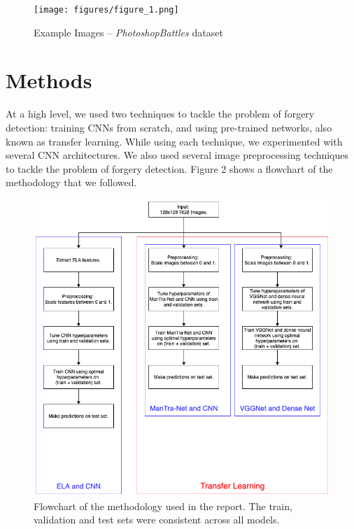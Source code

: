 \documentclass[11pt]{article}
\begin{document}
\begin{figure}[!htb]
    \centering
        \texttt{[image: figures/figure\_1.png]}
    \caption{Example Images -- {\it PhotoshopBattles} dataset}
    \label{fig:1}
\end{figure}

\section{Methods}

At a high level, we used two techniques to tackle the problem of forgery detection: training CNNs from scratch, and using pre-trained networks, also known as transfer learning. While using each technique, we experimented with several CNN architectures. We also used several image preprocessing techniques to tackle the problem of forgery detection. Figure 2 shows a flowchart of the methodology that we followed.

\begin{figure}[!htb]
    \centering
        \includegraphics[scale=.55]{figures/figure_2.png}
    \caption{Flowchart of the methodology used in the report. The train, validation and test sets were consistent across all models.
}
    \label{fig:2}
\end{figure}
\end{document}
